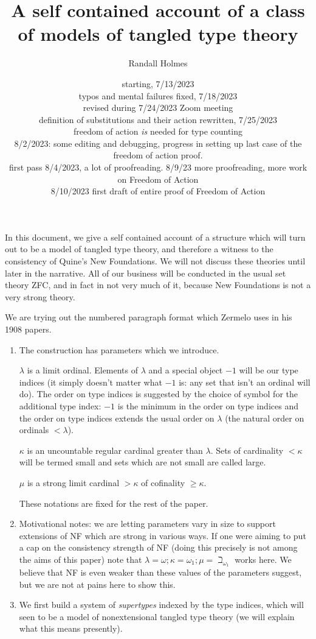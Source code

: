 \documentclass[12pt]{article}
\title{A self contained account of a class of models of tangled type theory}
\author{Randall Holmes}
\date{starting, 7/13/2023\\
typos and mental failures fixed, 7/18/2023\\
revised during 7/24/2023 Zoom meeting\\definition of substitutions and their action rewritten, 7/25/2023\\
freedom of action {\em is} needed for type counting\\
8/2/2023:  some editing and debugging, progress in setting up last case of the freedom of action proof.\\
first pass 8/4/2023, a lot of proofreading.
8/9/23 more proofreading, more work on Freedom of Action\\
8/10/2023 first draft of entire proof of Freedom of Action}
\begin{document}
\maketitle

In this document, we give a self contained account of a structure which will turn out to be a model of tangled type theory, and therefore a witness to the consistency of Quine's New Foundations.
We will not discuss these theories until later in the narrative.  All of our business will be conducted in the usual set theory ZFC, and in fact in not very much of it, because New Foundations is not a very strong theory.

We are trying out the numbered paragraph format which Zermelo uses in his 1908 papers.

\begin{enumerate}

\item The construction has parameters which we introduce.

$\lambda$ is a limit ordinal.  Elements of $\lambda$ and a special object $-1$ will be our type indices (it simply doesn't matter what $-1$ is:  any set that isn't an ordinal will do).  The order on type indices is suggested by the choice of symbol for the additional type index:  $-1$ is the minimum in the order on type indices and the order on type indices extends the usual order on $\lambda$ (the natural order on ordinals $<\lambda$).

$\kappa$ is an uncountable regular cardinal greater than $\lambda$.  Sets of cardinality $<\kappa$ will be termed small and sets which are not small are called large.

$\mu$ is a strong limit cardinal $>\kappa$ of cofinality $\geq \kappa$.

These notations are fixed for the rest of the paper.

\item  Motivational notes:  we are letting parameters vary in size to support extensions of NF which are strong in various ways.  If one were aiming to put a cap on the consistency strength of NF (doing this precisely is not among the aims of this paper) note that $\lambda = \omega; \kappa = \omega_1; \mu = \beth_{\omega_1}$ works here.  We believe that NF is even weaker than these values of the parameters suggest, but we are not at pains here to show this.

\item We first build a system of {\em supertypes\/} indexed by the type indices, which will seen to be a model of nonextensional tangled type theory (we will explain what this means presently).


\end{enumerate}
\end{document}
